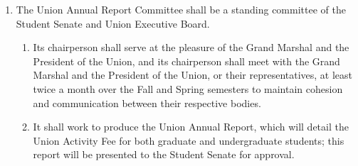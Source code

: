 \documentclass{uniondoc}
\begin{document}
\begin{enumerate}
	      \begin{enumerate}
		      \item It shall assess the state of Rensselaer academic courses.
		            \begin{enumerate}
			            \item To this end, it shall coordinate with the Senate Communications and Engagement Committee during outreach programs to ascertain student opinions and concerns regarding academics.
			            \item It shall work with relevant organizations within the Institute to identify areas for improvement regarding academics.
		            \end{enumerate}
		      \item It shall attempt to maintain a diverse membership that represents various academic departments.
		            \begin{enumerate}
			            \item It shall attempt to include graduate and undergraduate representation on the committee.
		            \end{enumerate}
		      \item It shall inform the Senate and the student body of any changes in academics at the Institute.
		      \item It shall be solely responsible for selecting all student representatives, including undergraduate and graduate representatives, to the Faculty Senate Curriculum Committee.
		      \item It shall be responsible for maintaining regular contact between the Student Senate and the Faculty Senate.
	      \end{enumerate}
	\item The Union Annual Report Committee shall be a standing committee of the Student Senate and Union Executive Board.
	      \begin{enumerate}
		      \item Its chairperson shall serve at the pleasure of the Grand Marshal and the President of the Union,
		            and its chairperson shall meet with the Grand Marshal and the President of the Union, or their representatives, at least twice a month over the Fall and Spring semesters to maintain cohesion and communication between their respective bodies.
		      \item It shall work to produce the Union Annual Report, which will detail the Union Activity Fee for both graduate and undergraduate students;
		            this report will be presented to the Student Senate for approval.

\end{enumerate}
\end{enumerate}
\end{document}
